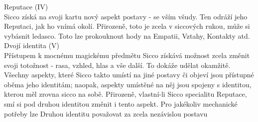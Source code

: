 \documentclass[../../main.tex]{subfiles}
\begin{document}
Reputace (IV) \\
Sicco získá na svoji kartu nový aspekt postavy - se vším všudy. Ten odráží jeho Reputaci, jak ho vnímá okolí. Přirozeně, toto je zcela v siccových rukou, může si vybásnit ledasco. Toto lze prokouknout hody na Empatii, Vztahy, Kontakty atd.\\

Dvojí identita (V)\\
Přístupem k mocnému magickému předmětu Sicco získává možnost zcela změnit svoji totožnost - rasa, vzhled, hlas a vše další. To dokáže udělat okamžitě. Všechny aspekty, které Sicco takto umístí na jiné postavy či objeví jsou přístupné oběma jeho identitám; naopak, aspekty umístěné na něj jsou spojeny s identitou, kterou měl zrovna sicco na sobě. Přirozeně, vlastní-li Sicco specialitu Reputace, smí si pod druhou identitou změnit i tento aspekt. Pro jakékoliv mechanické potřeby lze Druhou identitu považovat za zcela nezávislou postavu
\end{document}
